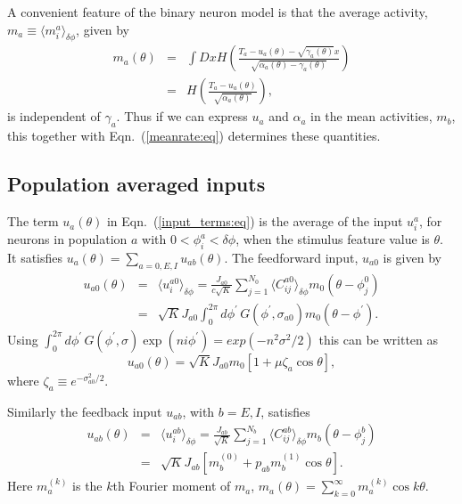 A convenient feature of the binary neuron model is that the average activity,
$m_a\equiv\langle m_i^a\rangle_{\delta\phi}$, given by
\begin{eqnarray}
m_a(\theta) & = &\int\! Dx
H\left(\frac{T_a-u_a(\theta)-\sqrt{\gamma_a(\theta)}x}
{ \sqrt{\alpha_a(\theta)-\gamma_a(\theta)}}\right) \nonumber \\
 & = & H\left(\frac{T_a-u_a(\theta)}{\sqrt{\alpha_a(\theta)}}\right),
\label{meanrate:eq}
\end{eqnarray}
is independent of $\gamma_a$\@. Thus if we can express $u_a$ and $\alpha_a$ 
in the mean activities, $m_b$, this together with Eqn.~(\ref{meanrate:eq}) 
determines these quantities.

\subsection{Population averaged inputs}
The term $u_a(\theta)$ in Eqn.~(\ref{input_terms:eq}) is the average 
of the input $u_i^a$, for neurons 
in population $a$ with $0<\phi_i^a<\delta \phi$, when the stimulus feature 
value is $\theta$. It satisfies
$u_a(\theta)=\sum_{a=0,E,I}u_{ab}(\theta)$.
The feedforward input, $u_{a0}$ is given by
\begin{eqnarray}
u_{a0}(\theta) & = & \langle u_i^{a0}\rangle_{\delta\phi}= 
\frac{J_{a0}}{c\sqrt{K}}\sum_{j=1}^{N_0}\langle C_{ij}^{a0}
\rangle_{\delta\phi}m_0(\theta-\phi_j^0)
\nonumber \\
   & = &  \sqrt{K}J_{a0}\int_0^{2\pi} d\phi^\prime\, G(\phi^\prime,\sigma_{a0})
m_0(\theta-\phi^\prime).
\end{eqnarray}
Using $\int_0^{2\pi} d\phi^\prime\, G(\phi^\prime,\sigma)\exp(ni\phi^\prime) =
exp(-n^2\sigma^2/2)$ this can be written as
\begin{equation}
u_{a0}(\theta)=\sqrt{K}J_{a0}m_0[1+\mu\zeta_a\cos \theta],
\label{uA0:eq}
\end{equation}
where $\zeta_a\equiv e^{-\sigma_{a0}^2/2}$\@.

Similarly the feedback input $u_{ab}$, with $b=E,I$, satisfies
\begin{eqnarray}
u_{ab}(\theta) & = & \langle u_i^{ab}\rangle_{\delta\phi} = 
\frac{J_{ab}}{\sqrt{K}} \sum_{j=1}^{N_b}
\langle C_{ij}^{ab}\rangle_{\delta\phi}m_b(\theta-\phi_j^b)
\nonumber \\
& = & \sqrt{K}J_{ab}\left[ m_b^{(0)}+p_{ab}m_b^{(1)}\cos \theta\right].
\label{uAB:eq}
\end{eqnarray}
Here $m_a^{(k)}$ is the $k$th Fourier moment of $m_a$, $m_a(\theta)=
\sum_{k=0}^\infty m_a^{(k)}\cos k\theta$\@.
 
